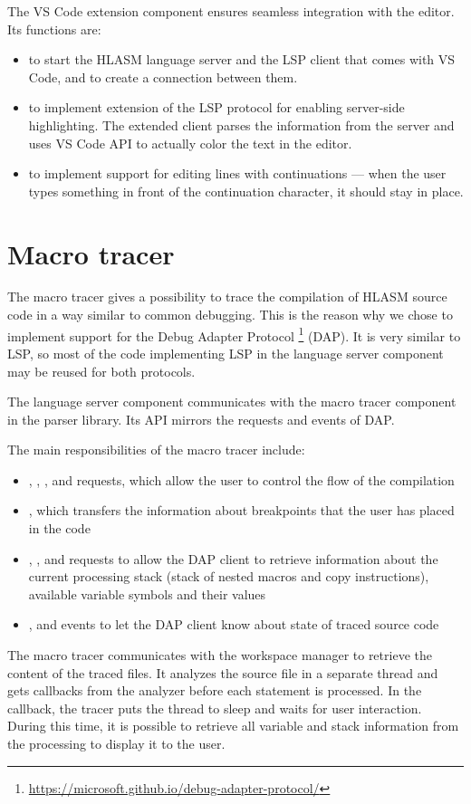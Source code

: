 The VS Code extension component ensures seamless integration with the editor. Its functions are:

\begin{itemize}
	\item to start the HLASM language server and the LSP client that comes with VS Code, and to create a connection between them.
	\item to implement extension of the LSP protocol for enabling server-side highlighting. The extended client parses the information from the server and uses VS Code API to actually color the text in the editor.
	\item to implement support for editing lines with continuations --- when the user types something in front of the continuation character, it should stay in place.
\end{itemize}


\section{Macro tracer}
\label{arch:macro}
The macro tracer gives a possibility to trace the compilation of HLASM source code in a way similar to common debugging. This is the reason why we chose to implement support for the Debug Adapter Protocol \footnote{\url{https://microsoft.github.io/debug-adapter-protocol/}} (DAP). It is very similar to LSP, so most of the code implementing LSP in the language server component may be reused for both protocols.

The language server component communicates with the macro tracer component in the parser library. Its API mirrors the requests and events of DAP.

The main responsibilities of the macro tracer include:

\begin{itemize}
	\item {}, , ,  and  requests, which allow the user to control the flow of the compilation
	\item {}, which transfers the information about breakpoints that the user has placed in the code
	\item {}, ,  and  requests to allow the DAP client to retrieve information about the current processing stack (stack of nested macros and copy instructions), available variable symbols and their values
	\item {},  and  events to let the DAP client know about state of traced source code
\end{itemize}

The macro tracer communicates with the workspace manager to retrieve the content of the traced files. It analyzes the source file in a separate thread and gets callbacks from the analyzer before each statement is processed. In the callback, the tracer puts the thread to sleep and waits for user interaction. During this time, it is possible to retrieve all variable and stack information from the processing to display it to the user.
